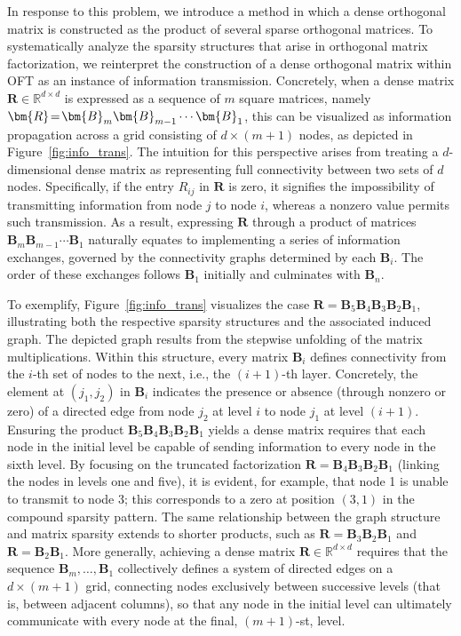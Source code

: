 In response to this problem, we introduce a method in which a dense orthogonal matrix is constructed as the product of several sparse orthogonal matrices. To systematically analyze the sparsity structures that arise in orthogonal matrix factorization, we reinterpret the construction of a dense orthogonal matrix within OFT as an instance of information transmission. Concretely, when a dense matrix $\bm{R}\in\mathbb{R}^{d\times d}$ is expressed as a sequence of $m$ square matrices, namely $\thickmuskip=2mu \medmuskip=2mu \bm{R}=\bm{B}_m\bm{B}_{m-1}\cdots\bm{B}_1$, this can be visualized as information propagation across a grid consisting of $d\times (m+1)$ nodes, as depicted in Figure~\ref{fig:info_trans}. The intuition for this perspective arises from treating a $d$-dimensional dense matrix as representing full connectivity between two sets of $d$ nodes. Specifically, if the entry $R_{ij}$ in $\bm{R}$ is zero, it signifies the impossibility of transmitting information from node $j$ to node $i$, whereas a nonzero value permits such transmission. As a result, expressing $\bm{R}$ through a product of matrices $\bm{B}_m\bm{B}_{m-1}\cdots\bm{B}_1$ naturally equates to implementing a series of information exchanges, governed by the connectivity graphs determined by each $\bm{B}_i$. The order of these exchanges follows $\bm{B}_1$ initially and culminates with $\bm{B}_n$.

To exemplify, Figure~\ref{fig:info_trans} visualizes the case $\bm{R}=\bm{B}_5\bm{B}_4\bm{B}_3\bm{B}_2\bm{B}_1$, illustrating both the respective sparsity structures and the associated induced graph. The depicted graph results from the stepwise unfolding of the matrix multiplications. Within this structure, every matrix $\bm{B}_i$ defines connectivity from the $i$-th set of nodes to the next, i.e., the $(i+1)$-th layer. Concretely, the element at $(j_1, j_2)$ in $\bm{B}_i$ indicates the presence or absence (through nonzero or zero) of a directed edge from node $j_2$ at level $i$ to node $j_1$ at level $(i+1)$. Ensuring the product $\bm{B}_5\bm{B}_4\bm{B}_3\bm{B}_2\bm{B}_1$ yields a dense matrix requires that each node in the initial level be capable of sending information to every node in the sixth level. By focusing on the truncated factorization $\bm{R}=\bm{B}_4\bm{B}_3\bm{B}_2\bm{B}_1$ (linking the nodes in levels one and five), it is evident, for example, that node 1 is unable to transmit to node 3; this corresponds to a zero at position $(3,1)$ in the compound sparsity pattern. The same relationship between the graph structure and matrix sparsity extends to shorter products, such as $\bm{R}=\bm{B}_3\bm{B}_2\bm{B}_1$ and $\bm{R}=\bm{B}_2\bm{B}_1$. More generally, achieving a dense matrix $\bm{R}\in\mathbb{R}^{d\times d}$ requires that the sequence $\bm{B}_m,\ldots,\bm{B}_1$ collectively defines a system of directed edges on a $d\times (m+1)$ grid, connecting nodes exclusively between successive levels (that is, between adjacent columns), so that any node in the initial level can ultimately communicate with every node at the final, $(m+1)$-st, level.

